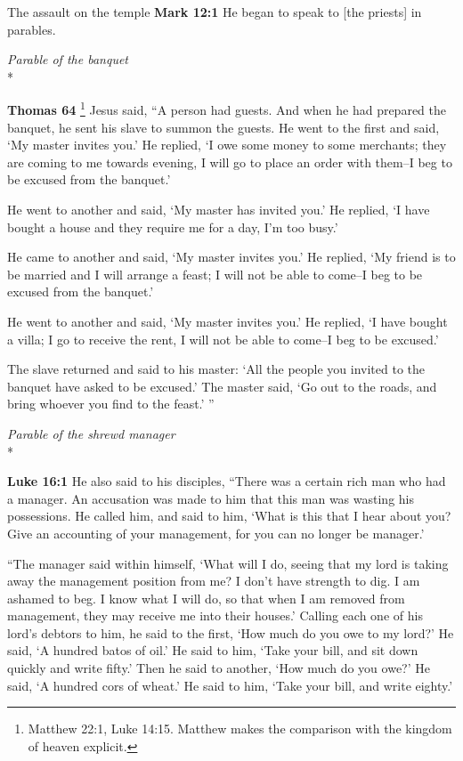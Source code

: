 \documentclass[10pt,twoside]{article} %
\newcommand{\quotesize}{\normalsize{}}
\newenvironment{quotetext}{\begingroup\quotesize}{\endgroup}
\newcommand{\intex}[1]{\index[texts]{#1}}
\newcommand{\bible}[2]{\begin{quotetext}\textbf{#1}\intex{#1} #2\end{quotetext}}
\newcommand{\gospelmark}[2]{\bible{Mark #1}{#2}}
\newcommand{\luke}[2]{\bible{Luke #1}{#2}}
\newcommand{\thomas}[2]{\bible{Thomas #1}{#2}}
\newcommand{\subhead}[1]{\emph{#1}\\*}
\begin{document}
\begin{section}{The assault on the temple}
\gospelmark{12:1}{
   He began to speak to [the priests] in parables.}

\subhead{Parable of the banquet}

\thomas{64}{\footnote{Matthew 22:1, Luke 14:15. Matthew makes the comparison with the kingdom of heaven explicit.}
Jesus said, ``A person had guests. And when he had prepared the banquet, he sent his
slave to summon the guests. He went to the first and said, `My
master invites you.' He replied, `I owe some money to some merchants;
they are coming to me towards evening, I will go to place an order
with them--I beg to be excused from the banquet.'

He went to another and said,
`My master has invited you.' He replied, `I
have bought a house and they require me for a day, I'm too busy.'

He came to another and said, `My master
invites you.' He replied, `My friend is to be married and I
will arrange a feast; I will not be able to come--I beg to be
excused from the banquet.'

He went to another and said, `My
master invites you.' He replied, `I have bought a villa; I go
to receive the rent, I will not be able to come--I beg to be
excused.'

The slave returned and said to his master: `All the people you
invited to the banquet have asked to be excused.' The master said,
`Go out to the roads, and bring whoever you find
to the feast.' ''
}


\subhead{Parable of the shrewd manager}

\luke{16:1}{
He also said to his disciples, ``There was a certain rich man who had a manager. An accusation was made to him that this man was wasting his possessions.  
  He called him, and said to him, `What is this that I hear about you? Give an accounting of your management, for you can no longer be manager.'

   ``The manager said within himself, `What will I do, seeing that my lord is taking away the management position from me? I don't have strength to dig. I am ashamed to beg.    I know what I will do, so that when I am removed from management, they may receive me into their houses.'    Calling each one of his lord's debtors to him, he said to the first, `How much do you owe to my lord?'    He said, `A hundred batos of oil.' He said to him, `Take your bill, and sit down quickly and write fifty.'    Then he said to another, `How much do you owe?' He said, `A hundred cors of wheat.' He said to him, `Take your bill, and write eighty.'

}
\end{section}
\end{document}
